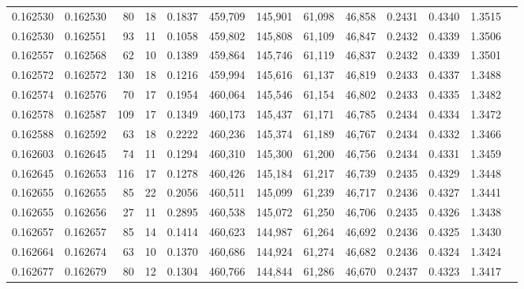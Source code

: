 \begin{tabular}{rrrrrrrrrrrrr}
0.162530 & 0.162530 &    80 &  18 &                                     0.1837 & 459,709 & 145,901 &  61,098 &  46,858 & 0.2431 & 0.4340 & 1.3515 \\
0.162530 & 0.162551 &    93 &  11 &                                     0.1058 & 459,802 & 145,808 &  61,109 &  46,847 & 0.2432 & 0.4339 & 1.3506 \\
0.162557 & 0.162568 &    62 &  10 &                                     0.1389 & 459,864 & 145,746 &  61,119 &  46,837 & 0.2432 & 0.4339 & 1.3501 \\
0.162572 & 0.162572 &   130 &  18 &                                     0.1216 & 459,994 & 145,616 &  61,137 &  46,819 & 0.2433 & 0.4337 & 1.3488 \\
0.162574 & 0.162576 &    70 &  17 &                                     0.1954 & 460,064 & 145,546 &  61,154 &  46,802 & 0.2433 & 0.4335 & 1.3482 \\
0.162578 & 0.162587 &   109 &  17 &                                     0.1349 & 460,173 & 145,437 &  61,171 &  46,785 & 0.2434 & 0.4334 & 1.3472 \\
0.162588 & 0.162592 &    63 &  18 &                                     0.2222 & 460,236 & 145,374 &  61,189 &  46,767 & 0.2434 & 0.4332 & 1.3466 \\
0.162603 & 0.162645 &    74 &  11 &                                     0.1294 & 460,310 & 145,300 &  61,200 &  46,756 & 0.2434 & 0.4331 & 1.3459 \\
0.162645 & 0.162653 &   116 &  17 &                                     0.1278 & 460,426 & 145,184 &  61,217 &  46,739 & 0.2435 & 0.4329 & 1.3448 \\
0.162655 & 0.162655 &    85 &  22 &                                     0.2056 & 460,511 & 145,099 &  61,239 &  46,717 & 0.2436 & 0.4327 & 1.3441 \\
0.162655 & 0.162656 &    27 &  11 &                                     0.2895 & 460,538 & 145,072 &  61,250 &  46,706 & 0.2435 & 0.4326 & 1.3438 \\
0.162657 & 0.162657 &    85 &  14 &                                     0.1414 & 460,623 & 144,987 &  61,264 &  46,692 & 0.2436 & 0.4325 & 1.3430 \\
0.162664 & 0.162674 &    63 &  10 &                                     0.1370 & 460,686 & 144,924 &  61,274 &  46,682 & 0.2436 & 0.4324 & 1.3424 \\
0.162677 & 0.162679 &    80 &  12 &                                     0.1304 & 460,766 & 144,844 &  61,286 &  46,670 & 0.2437 & 0.4323 & 1.3417 \\

\end{tabular}
